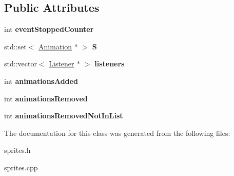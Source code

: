\subsection*{Public Attributes}
\begin{DoxyCompactItemize}
\item 
\hypertarget{classg2c_1_1_animator_a6817e559374a8e57f8ac1ea596b64635}{
int {\bfseries eventStoppedCounter}}
\label{classg2c_1_1_animator_a6817e559374a8e57f8ac1ea596b64635}

\item 
\hypertarget{classg2c_1_1_animator_a757a0d19c9bb33da9d98dcd03b2a1663}{
std::set$<$ \hyperlink{classg2c_1_1_animation}{Animation} $\ast$ $>$ {\bfseries S}}
\label{classg2c_1_1_animator_a757a0d19c9bb33da9d98dcd03b2a1663}

\item 
\hypertarget{classg2c_1_1_animator_a0c6cfbc8f6b3a140e1fd101aa07f6cd1}{
std::vector$<$ \hyperlink{classg2c_1_1_listener}{Listener} $\ast$ $>$ {\bfseries listeners}}
\label{classg2c_1_1_animator_a0c6cfbc8f6b3a140e1fd101aa07f6cd1}

\item 
\hypertarget{classg2c_1_1_animator_a805f33797ca9074e59459bdd4486c42e}{
int {\bfseries animationsAdded}}
\label{classg2c_1_1_animator_a805f33797ca9074e59459bdd4486c42e}

\item 
\hypertarget{classg2c_1_1_animator_ae8d947257c92508cbdb189ecb33cd33a}{
int {\bfseries animationsRemoved}}
\label{classg2c_1_1_animator_ae8d947257c92508cbdb189ecb33cd33a}

\item 
\hypertarget{classg2c_1_1_animator_ad4fe0a77478d0ac8a0b129497b8f7e99}{
int {\bfseries animationsRemovedNotInList}}
\label{classg2c_1_1_animator_ad4fe0a77478d0ac8a0b129497b8f7e99}

\end{DoxyCompactItemize}


The documentation for this class was generated from the following files:\begin{DoxyCompactItemize}
\item 
sprites.h\item 
sprites.cpp\end{DoxyCompactItemize}

